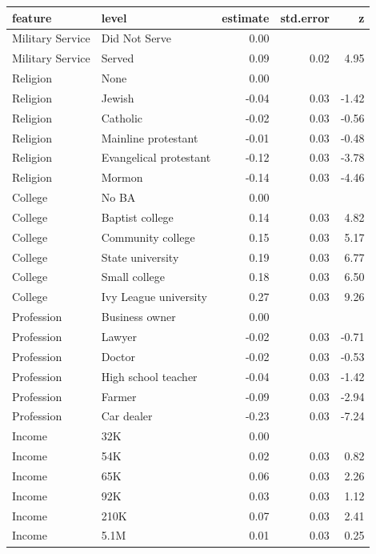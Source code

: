 \documentclass[a4paper,12pt]{article}\usepackage[]{graphicx}\usepackage[]{color}
\begin{document}
\begin{table}[ht]
\centering
\begingroup\footnotesize
\begin{tabular}{lp{3in}rrr}
  \hline
feature & level & estimate & std.error & z \\ 
  \hline
Military Service & Did Not Serve & 0.00 &  &  \\ 
  Military Service & Served & 0.09 & 0.02 & 4.95 \\ 
  Religion & None & 0.00 &  &  \\ 
  Religion & Jewish & -0.04 & 0.03 & -1.42 \\ 
  Religion & Catholic & -0.02 & 0.03 & -0.56 \\ 
  Religion & Mainline protestant & -0.01 & 0.03 & -0.48 \\ 
  Religion & Evangelical protestant & -0.12 & 0.03 & -3.78 \\ 
  Religion & Mormon & -0.14 & 0.03 & -4.46 \\ 
  College & No BA & 0.00 &  &  \\ 
  College & Baptist college & 0.14 & 0.03 & 4.82 \\ 
  College & Community college & 0.15 & 0.03 & 5.17 \\ 
  College & State university & 0.19 & 0.03 & 6.77 \\ 
  College & Small college & 0.18 & 0.03 & 6.50 \\ 
  College & Ivy League university & 0.27 & 0.03 & 9.26 \\ 
  Profession & Business owner & 0.00 &  &  \\ 
  Profession & Lawyer & -0.02 & 0.03 & -0.71 \\ 
  Profession & Doctor & -0.02 & 0.03 & -0.53 \\ 
  Profession & High school teacher & -0.04 & 0.03 & -1.42 \\ 
  Profession & Farmer & -0.09 & 0.03 & -2.94 \\ 
  Profession & Car dealer & -0.23 & 0.03 & -7.24 \\ 
  Income & 32K & 0.00 &  &  \\ 
  Income & 54K & 0.02 & 0.03 & 0.82 \\ 
  Income & 65K & 0.06 & 0.03 & 2.26 \\ 
  Income & 92K & 0.03 & 0.03 & 1.12 \\ 
  Income & 210K & 0.07 & 0.03 & 2.41 \\ 
  Income & 5.1M & 0.01 & 0.03 & 0.25 \\ 

\end{tabular}
\end{table}
\end{document}
